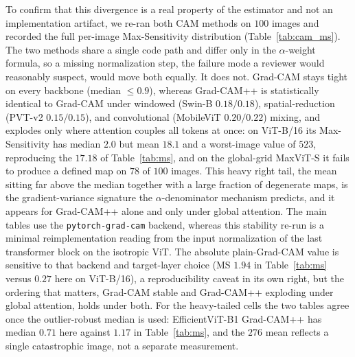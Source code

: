 \documentclass[final,5p,times,twocolumn]{elsarticle}
\begin{document}
To confirm that this divergence is a real property of the estimator and not an implementation artifact, we re-ran both CAM methods on $100$ images and recorded the full per-image Max-Sensitivity distribution (Table~\ref{tab:cam_ms}). The two methods share a single code path and differ only in the $\alpha$-weight formula, so a missing normalization step, the failure mode a reviewer would reasonably suspect, would move both equally. It does not. Grad-CAM stays tight on every backbone (median $\le 0.9$), whereas Grad-CAM++ is statistically identical to Grad-CAM under windowed (Swin-B $0.18/0.18$), spatial-reduction (PVT-v2 $0.15/0.15$), and convolutional (MobileViT $0.20/0.22$) mixing, and explodes only where attention couples all tokens at once: on ViT-B/16 its Max-Sensitivity has median $2.0$ but mean $18.1$ and a worst-image value of $523$, reproducing the $17.18$ of Table~\ref{tab:ms}, and on the global-grid MaxViT-S it fails to produce a defined map on $78$ of $100$ images. This heavy right tail, the mean sitting far above the median together with a large fraction of degenerate maps, is the gradient-variance signature the $\alpha$-denominator mechanism predicts, and it appears for Grad-CAM++ alone and only under global attention. The main tables use the \texttt{pytorch-grad-cam} backend, whereas this stability re-run is a minimal reimplementation reading from the input normalization of the last transformer block on the isotropic ViT. The absolute plain-Grad-CAM value is sensitive to that backend and target-layer choice (MS $1.94$ in Table~\ref{tab:ms} versus $0.27$ here on ViT-B/16), a reproducibility caveat in its own right, but the ordering that matters, Grad-CAM stable and Grad-CAM++ exploding under global attention, holds under both. For the heavy-tailed cells the two tables agree once the outlier-robust median is used: EfficientViT-B1 Grad-CAM++ has median $0.71$ here against $1.17$ in Table~\ref{tab:ms}, and the $276$ mean reflects a single catastrophic image, not a separate measurement.
\end{document}
